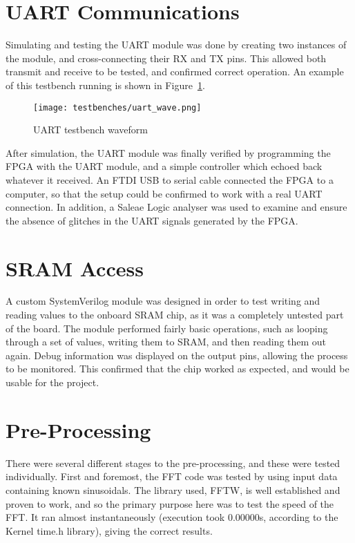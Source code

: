 \section{UART Communications} %
\label{sec:uart_communications_testing}
	Simulating and testing the UART module was done by creating two instances of the module, and cross-connecting their RX and TX pins.  This allowed both transmit and receive to be tested, and confirmed correct operation.  An example of this testbench running is shown in Figure~\ref{fig:test_uart}.  

	\begin{figure}[tb]
		\begin{center}
			\texttt{[image: testbenches/uart\_wave.png]}
		\end{center}
		\caption{UART testbench waveform}
		\label{fig:test_uart}
	\end{figure}

	After simulation, the UART module was finally verified by programming the FPGA with the UART module, and a simple controller which echoed back whatever it received.  An FTDI USB to serial cable connected the FPGA to a computer, so that the setup could be confirmed to work with a real UART connection.  In addition, a Saleae Logic analyser was used to examine and ensure the absence of glitches in the UART signals generated by the FPGA.


\section{SRAM Access} %
\label{sec:sram_access_testing}
	A custom SystemVerilog module was designed in order to test writing and reading values to the onboard SRAM chip, as it was a completely untested part of the board.  The module performed fairly basic operations, such as looping through a set of values, writing them to SRAM, and then reading them out again.  Debug information was displayed on the output pins, allowing the process to be monitored.  This confirmed that the chip worked as expected, and would be usable for the project.


\section{Pre-Processing} %
\label{sec:pre_processing_testing}
	There were several different stages to the pre-processing, and these were tested individually.  First and foremost, the FFT code was tested by using input data containing known sinusoidals.  The library used, FFTW, is well established and proven to work, and so the primary purpose here was to test the speed of the FFT.  It ran almost instantaneously (execution took 0.00000s, according to the Kernel time.h library), giving the correct results. %

